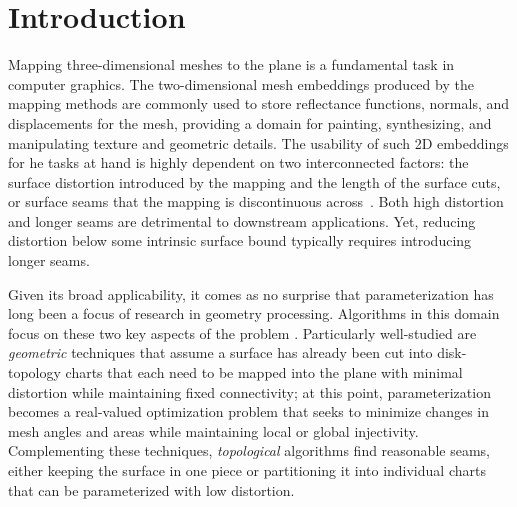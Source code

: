 
\section{Introduction}
Mapping three-dimensional meshes to the plane is a fundamental task in computer graphics.  The two-dimensional mesh embeddings produced by the mapping methods are commonly used to store reflectance functions, normals, and displacements
for the mesh, providing a domain for painting, synthesizing, and manipulating texture and geometric details. 
The usability of such 2D embeddings for he tasks at hand is highly dependent on two interconnected factors: the surface distortion introduced by the mapping and the length of the surface cuts, or surface seams that the mapping is discontinuous across~\cite{Sheffer07_ParameterizationSurvey,Hormann07_ParameterizationSurvey}. Both high distortion and longer seams are detrimental to downstream applications. Yet, reducing distortion below some intrinsic surface bound typically requires introducing longer seams. 

Given its broad applicability, it comes as no surprise that parameterization has long been a focus of research in geometry processing.  Algorithms in this domain focus on these two key aspects of the problem \cite{Sheffer07_ParameterizationSurvey,Hormann07_ParameterizationSurvey}.  Particularly well-studied are \emph{geometric} techniques that assume a surface has already been cut into disk-topology charts that each need to be mapped into the plane with minimal distortion while maintaining fixed connectivity; at this point, parameterization becomes a real-valued optimization problem that seeks to minimize changes in mesh angles and areas while maintaining local or global injectivity. Complementing these techniques, \emph{topological} algorithms find reasonable seams, either keeping the surface in one piece or partitioning it into individual charts that can be parameterized with low distortion.   

